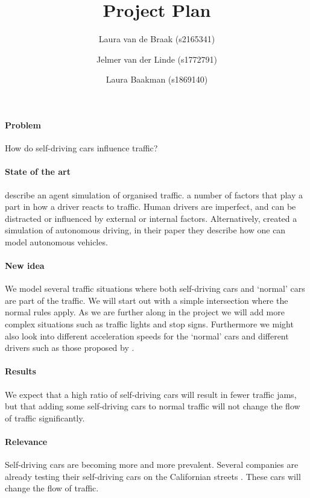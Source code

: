 \documentclass[a4paper]{article}
\title{Project Plan\\ \sc{traffic simulation self-driving cars}}
\author{%
	Laura van de Braak (s2165341) \and 
	Jelmer van der Linde (s1772791) \and 
	Laura Baakman (s1869140)
}
\begin{document}
\maketitle

\paragraph{Problem} How do self-driving cars influence traffic?

\paragraph{State of the art} \citeauthor{paruchuri2002multi} describe an agent simulation of organised traffic. a number of factors that play a part in how a driver reacts to traffic. Human drivers are imperfect, and can be distracted or influenced by external or internal factors. Alternatively, \citeauthor{jiang2010microscopic} created a simulation of autonomous driving, in their paper they describe how one can model autonomous vehicles. 

\paragraph{New idea} We model several traffic situations where both self-driving cars and `normal' cars are part of the traffic. We will start out with a simple intersection where the normal rules apply. As we are further along in the project we will add more complex situations such as traffic lights and stop signs. Furthermore we might also look into different acceleration speeds for the `normal' cars and different drivers such as those proposed by \citeauthor{paruchuri2002multi}.

\paragraph{Results} We expect that a high ratio of self-driving cars will result in fewer traffic jams, but that adding some self-driving cars to normal traffic will not change the flow of traffic significantly.  

\paragraph{Relevance} Self-driving cars are becoming more and more prevalent. Several companies are already testing their self-driving cars on the Californian streets \cite{honda}. These cars will change the flow of traffic. 

\printbibliography
\end{document}
